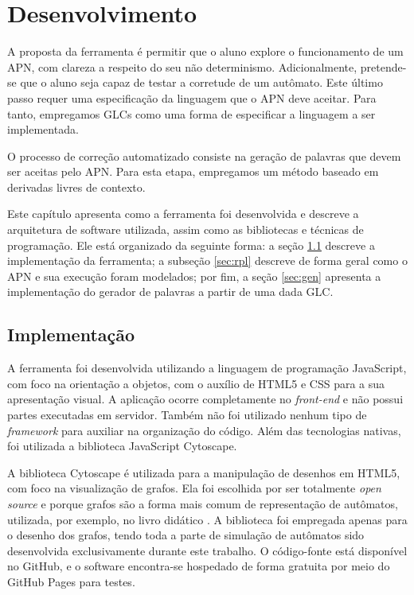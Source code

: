 \chapter{Desenvolvimento}
\label{cap:desenvolvimento}
A proposta da ferramenta é permitir que o aluno explore o funcionamento de um APN, com clareza a respeito do seu não determinismo. Adicionalmente, pretende-se que o aluno seja capaz de testar a corretude de um autômato. Este último passo requer uma especificação da linguagem que o APN deve aceitar. Para tanto, empregamos GLCs como uma forma de especificar a linguagem a ser implementada.

O processo de correção automatizado consiste na geração de palavras que devem ser aceitas pelo APN. Para esta etapa, empregamos um método baseado em derivadas livres de contexto.

Este capítulo apresenta como a ferramenta foi desenvolvida e descreve a arquitetura de software utilizada, assim como as bibliotecas e técnicas de programação. Ele está organizado da seguinte forma: a seção \ref{sec:impl} descreve a implementação da ferramenta; a subseção \ref{sec:rpl} descreve de forma geral como o APN e sua execução foram modelados; por fim, a seção \ref{sec:gen} apresenta a implementação do gerador de palavras a partir de uma dada GLC.


\section{Implementação}\label{sec:impl}

A ferramenta foi desenvolvida utilizando a linguagem de programação JavaScript, com foco na orientação a objetos, com o auxílio de HTML5 e CSS para a sua apresentação visual. A aplicação ocorre completamente no \emph{front-end} e não possui partes executadas em servidor. Também não foi utilizado nenhum tipo de \emph{framework} para auxiliar na organização do código. Além das tecnologias nativas, foi utilizada a biblioteca JavaScript Cytoscape.

A biblioteca Cytoscape é utilizada para a manipulação de desenhos em HTML5, com foco na visualização de grafos. Ela foi escolhida por ser totalmente \emph{open source} e porque grafos são a forma mais comum de representação de autômatos, utilizada, por exemplo, no livro didático \cite{vieira2006}. A biblioteca foi empregada apenas para o desenho dos grafos, tendo toda a parte de simulação de autômatos sido desenvolvida exclusivamente durante este trabalho. O código-fonte está disponível no GitHub, e o software encontra-se hospedado de forma gratuita por meio do GitHub Pages para testes.

